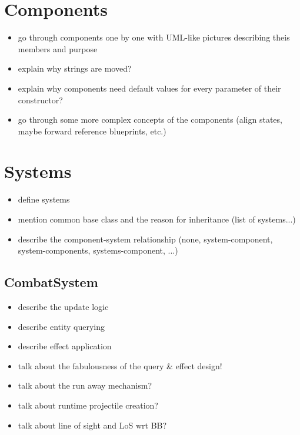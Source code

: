 \section{Components}

\begin{itemize}
    \item go through components one by one with UML-like pictures describing theis members and purpose
    \item explain why strings are moved?
    \item explain why components need default values for every parameter of their constructor?
    \item go through some more complex concepts of the components (align states, maybe forward reference blueprints, etc.)
\end{itemize}

\section{Systems}

\begin{itemize}
    \item define systems
    \item mention common base class and the reason for inheritance (list of systems...)
    \item describe the component-system relationship (none, system-component, system-components, systems-component, ...)
\end{itemize}

\subsection{CombatSystem}

\begin{itemize}
    \item describe the update logic
    \item describe entity querying
    \item describe effect application
    \item talk about the fabulousness of the query \& effect design!
    \item talk about the run away mechanism?
    \item talk about runtime projectile creation?
    \item talk about line of sight and LoS wrt BB?
\end{itemize}

